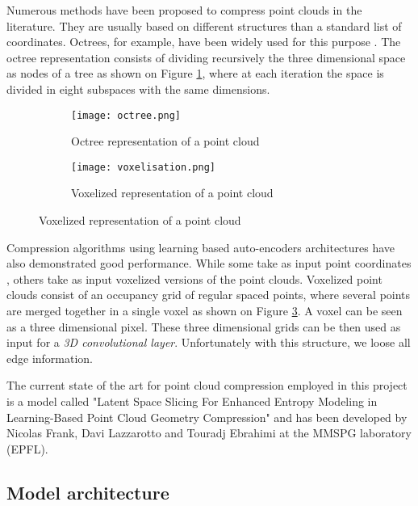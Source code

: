 \label{sec:pcc}

Numerous methods have been proposed to compress point clouds in the literature. They are usually based on different structures than a standard list of coordinates.                                
Octrees, for example, have been widely used for this purpose \cite{bib:octree}. 
The octree representation consists of dividing recursively the three dimensional space as nodes of a tree as shown on Figure \ref{fig:octree}, where at each iteration the space is divided in eight subspaces with the same dimensions.

\begin{figure}
    \centering
    \begin{subfigure}{0.5\textwidth}
        \centering
        \texttt{[image: octree.png]}
        \caption{Octree representation of a point cloud}
        \label{fig:octree}
    \end{subfigure}
    \begin{subfigure}{0.5\textwidth}
        \centering
        \texttt{[image: voxelisation.png]}
        \caption{Voxelized representation of a point cloud}
        \label{fig:voxelized}
    \end{subfigure}
\end{figure}

Compression algorithms using learning based auto-encoders architectures have also demonstrated good performance. While some take as input point coordinates \cite{bib:9102866}, others take as input voxelized versions of the point clouds. 
Voxelized point clouds consist of an occupancy grid of regular spaced points, where several points are merged together in a single voxel as shown on Figure \ref{fig:voxelized}.
A voxel can be seen as a three dimensional pixel.
These three dimensional grids can be then used as input for a \textit{3D convolutional layer}. 
Unfortunately with this structure, we loose all edge information.


The current state of the art for point cloud compression employed in this project is a model called "Latent Space Slicing For Enhanced Entropy Modeling in Learning-Based Point Cloud Geometry Compression" and has been developed by Nicolas Frank, Davi Lazzarotto and Touradj Ebrahimi at the MMSPG laboratory (EPFL).

\subsection{Model architecture}
\label{subsec:model-architecture}

